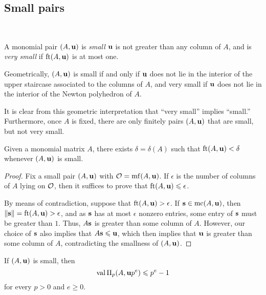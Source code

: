 \documentclass[11pt]{amsart}
\begin{document}
\subsection{Small pairs}

\ 

\begin{definition}
A monomial pair $(A, \mathbf{u})$ is \emph{small} $\mathbf{u}$ is not greater than any column of $A$, and is \emph{very small} if $\operatorname{ft}(A, \mathbf{u})$ is at most one.
\end{definition}

\begin{remark}
\label{finitely many small but not very small: R}
Geometrically, $(A, \mathbf{u})$ is small if and only if $\mathbf{u}$ does not lie in the interior of the upper staircase associated to the columns of $A$, and very small if $\mathbf{u}$ does not lie in the interior of the Newton polyhedron of $A$.  

It is clear from this geometric interpretation that ``very small'' implies ``small.''  Furthermore, once $A$ is fixed, there are only finitely pairs $(A, \mathbf{u})$ that are small, but not very small. 
\end{remark}

\begin{lemma}
\label{refined-discreteness: L}
Given a monomial matrix $A$, there exists $\delta = \delta(A)$ such that $\operatorname{ft}(A, \mathbf{u}) < \delta$ whenever $(A, \mathbf{u})$ is small.
\end{lemma}

\begin{proof}   Fix a small pair $(A, \mathbf{u})$ with $\mathcal{O} = \operatorname{mf}(A, \mathbf{u})$.  If $\epsilon$ is the number of columns of $A$ lying on $\mathcal{O}$, then it suffices to prove that $\operatorname{ft}(A, \mathbf{u}) \leqslant \epsilon$.

By means of contradiction, suppose that $\operatorname{ft}(A, \mathbf{u}) > \epsilon$.  If $\mathbf{s} \in \operatorname{mc}(A,\mathbf{u})$, then $\| \mathbf{s} \| = \operatorname{ft}(A, \mathbf{u}) > \epsilon$, and as $\mathbf{s}$ has at most $\epsilon$ nonzero entries, some entry of $\mathbf{s}$ must be greater than $1$.  Thus, $A \mathbf{s}$ is greater than some column of $A$.  However, our choice of $\mathbf{s}$ also implies that $A \mathbf{s} \leqslant \mathbf{u}$, which then implies that $\mathbf{u}$ is greater than some column of $A$, contradicting the smallness of $(A, \mathbf{u})$.
\end{proof}

\begin{lemma}
\label{trivial value bound: L}
If $(A, \mathbf{u})$ is small, then 
 \[ \operatorname{val} \Pi_p(A, \mathbf{u}p^e) \leqslant p^{e} -1 \] for every $p > 0$ and $e \geq 0$.
\end{lemma}
\end{document}

